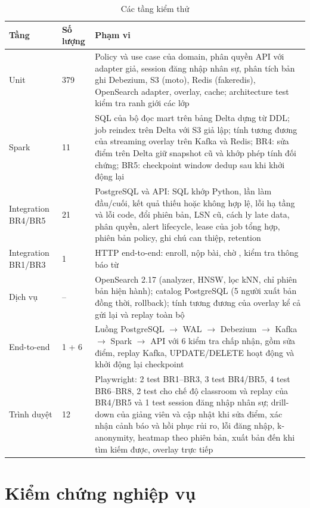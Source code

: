 \begin{table}[H]
\centering\small
\caption{Các tầng kiểm thử}\label{tab:tests}
\begin{tabularx}{\textwidth}{@{}L{3.3cm}L{1.6cm}Y@{}}
\toprule
\textbf{Tầng} & \textbf{Số lượng} & \textbf{Phạm vi} \\
\midrule
Unit & 379 & Policy và use case của domain, phân quyền API với adapter giả, session đăng nhập nhân sự, phân tích bản ghi Debezium, S3 (moto), Redis (fakeredis), OpenSearch adapter, overlay, cache; architecture test kiểm tra ranh giới các lớp \\
Spark & 11 & SQL của bộ đọc mart trên bảng Delta dựng từ DDL; job reindex trên Delta với S3 giả lập; tính tương đương của streaming overlay trên Kafka và Redis; BR4: sửa điểm trên Delta giữ snapshot cũ và khớp phép tính đối chứng; BR5: checkpoint window dedup sau khi khởi động lại \\
Integration BR4/BR5 & 21 & PostgreSQL và API: SQL khớp Python, lần làm đầu/cuối, kết quả thiếu hoặc không hợp lệ, lỗi hạ tầng và lỗi code, đổi phiên bản, LSN cũ, cách ly late data, phân quyền, alert lifecycle, lease của job tổng hợp, phiên bản policy, ghi chú can thiệp, retention \\
Integration BR1/BR3 & 1 & HTTP end-to-end: enroll, nộp bài, chờ , kiểm tra thông báo từ  \\
Dịch vụ & -- & OpenSearch 2.17 (analyzer, HNSW, lọc kNN, chỉ phiên bản hiện hành); catalog PostgreSQL (5 người xuất bản đồng thời, rollback); tính tương đương của overlay kể cả gửi lại và replay toàn bộ \\
End-to-end & 1 + 6 & Luồng PostgreSQL $\rightarrow$ WAL $\rightarrow$ Debezium $\rightarrow$ Kafka $\rightarrow$ Spark $\rightarrow$ API với 6 kiểm tra chấp nhận, gồm sửa điểm, replay Kafka, UPDATE/DELETE hoạt động và khởi động lại checkpoint \\
Trình duyệt & 12 & Playwright: 2 test BR1--BR3, 3 test BR4/BR5, 4 test BR6--BR8, 2 test cho chế độ classroom và replay của BR4/BR5 và 1 test session đăng nhập nhân sự; drill-down của giảng viên và cập nhật khi sửa điểm, xác nhận cảnh báo và hồi phục rủi ro, lỗi đăng nhập, k-anonymity, heatmap theo phiên bản, xuất bản đến khi tìm kiếm được, overlay trực tiếp \\
\bottomrule
\end{tabularx}
\end{table}

\section{Kiểm chứng nghiệp vụ}

